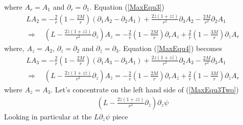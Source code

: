 \documentclass[12pt]{article}
\def\nn{\nonumber}
\begin{document}
where $A_{r} = A_{1}$ and $\partial_{r} = \partial_{1}$. Equation (\ref{MaxEqu3})
\begin{gather}
L A_{2}
=
-
\frac{2}{r}
(1 - \frac{2 M}{r})
(
\partial_{1}
A_{2}
-
\partial_{2}
A_{1}
)
+
\frac{2 \bar{z} (1 + z \bar{z})}{r^{2}}
\partial_{3}
A_{2}
-
\frac{2 M}{r^{2}}
\partial_{2}
A_{1}
\nn \\
\Rightarrow
\quad
\left(L 
-
\frac{2 \bar{z} (1 + z \bar{z})}{r^{2}}
\partial_{\bar{z}}
\right)
A_{z}
=
-
\frac{2}{r}
(1 - \frac{2 M}{r})
\partial_{r}
A_{z}
+
\frac{2}{r}
(1 - \frac{3 M}{r})
\partial_{z}
A_{r}
\label{MaxEqu3Two}
\end{gather}
where, $A_{z} = A_{2}$, $\partial_{z} = \partial_{2}$ and $\partial_{\bar{z}} = \partial_{3}$. Equation (\ref{MaxEqu4}) becomes
\begin{gather}
L A_{3}
=
-
\frac{2}{r}
(1 - \frac{2 M}{r})
(
\partial_{1}
A_{3}
-
\partial_{3}
A_{1}
)
+
\frac{2 z (1 + z \bar{z})}{r^{2}}
\partial_{2}
A_{3}
-
\frac{2 M}{r^{2}}
\partial_{3}
A_{1}
\nn \\
\Rightarrow
\quad
\left(
L 
-
\frac{2 z (1 + z \bar{z})}{r^{2}}
\partial_{z}
\right)
A_{\bar{z}}
=
-
\frac{2}{r}
(1 - \frac{2 M}{r})
\partial_{r}
A_{\bar{z}}
+
\frac{2}{r}
(1 - \frac{3 M}{r})
\partial_{\bar{z}}
A_{r}
\end{gather}
where $A_{\bar{z}} = A_{3}$. Let's concentrate on the left hand side of (\ref{MaxEqu3Two})
\begin{gather}
\left(
L
-
\frac{2 \bar{z} (1 + z \bar{z})}{r^{2}}
\partial_{\bar{z}}
\right)
\partial_{z}
\psi
\end{gather}
Looking in particular at the $L \partial_{z}\psi$ piece 
\end{document}
